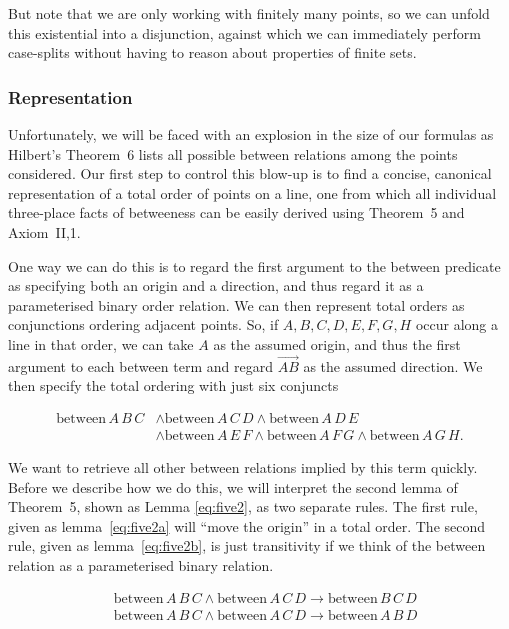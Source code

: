 \documentclass{article}
\newcommand{\between}[3]{\text{between}\,#1\,#2\,#3}
\begin{document}
But note that we are only working with finitely many points, so we can unfold this existential into a disjunction, against which we can immediately perform case-splits without having to reason about properties of finite sets. 

\subsubsection{Representation}
Unfortunately, we will be faced with an explosion in the size of our formulas as Hilbert's Theorem~6 lists all possible between relations among the points considered. Our first step to control this blow-up is to find a concise, canonical representation of a total order of points on a line, one from which all individual three-place facts of betweeness can be easily derived using Theorem~5 and Axiom~II,1. 

One way we can do this is to regard the first argument to the between predicate as specifying both an origin and a direction, and thus regard it as a parameterised binary order relation. We can then represent total orders as conjunctions ordering adjacent points. So, if $A,B,C,D,E,F,G,H$ occur along a line in that order, we can take $A$ as the assumed origin, and thus the first argument to each between term and regard $\overrightarrow{AB}$ as the assumed direction. We then specify the total ordering with just six conjuncts

\begin{align*}\label{theorem:OrderRepExample}
\between{A}{B}{C}& \wedge \between{A}{C}{D} \wedge \between{A}{D}{E}\tag{$\star$}\\
           &\wedge\between{A}{E}{F}\wedge\between{A}{F}{G}\wedge\between{A}{G}{H}.
\end{align*}

We want to retrieve all other between relations implied by this term quickly. Before we describe how we do this, we will interpret the second lemma of Theorem~5, shown as Lemma \eqref{eq:five2}, as two separate rules. The first rule, given as lemma~\eqref{eq:five2a} will ``move the origin'' in a total order. The second rule, given as lemma~\eqref{eq:five2b}, is just transitivity if we think of the between relation as a parameterised binary relation.

\begin{align}
&\between{A}{B}{C} \wedge \between{A}{C}{D} \rightarrow \between{B}{C}{D}\label{eq:five2a}\\
&\between{A}{B}{C} \wedge \between{A}{C}{D} \rightarrow \between{A}{B}{D}\label{eq:five2b}
\end{align}
\end{document}
